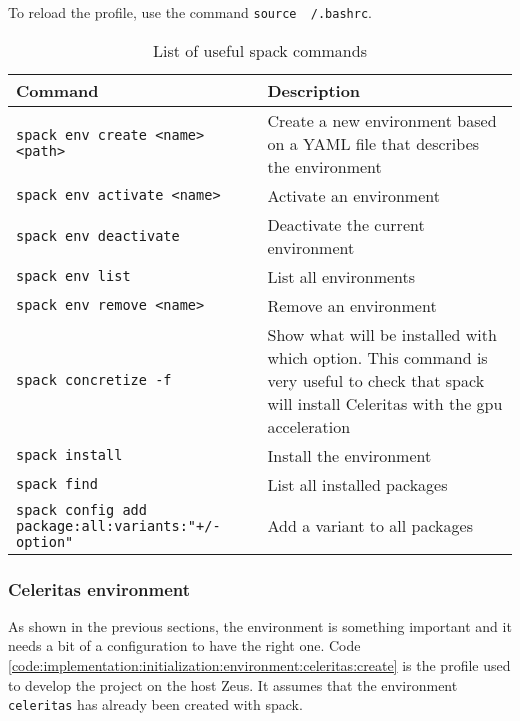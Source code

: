 To reload the profile, use the command \texttt{source ~/.bashrc}.

\begin{table}[ht]
    \centering
    \begin{tabular}{|m{}|m{}|}
        \hline
        \textbf{Command} & \textbf{Description} \\
        \hline
        \texttt{spack env create <name> <path>} & Create a new environment based
            on a YAML file that describes the environment \\
        \hline
        \texttt{spack env activate <name>} & Activate an environment \\
        \hline
        \texttt{spack env deactivate} & Deactivate the current environment \\
        \hline
        \texttt{spack env list} & List all environments \\
        \hline
        \texttt{spack env remove <name>} & Remove an environment \\
        \hline
        \texttt{spack concretize -f} & Show what will be installed with which option.
            This command is very useful to check that spack will install
            Celeritas with the \acrshort{gpu} acceleration \\
        \hline
        \texttt{spack install} & Install the environment \\
        \hline
        \texttt{spack find} & List all installed packages \\
        \hline
        \texttt{spack config add package:all:variants:"+/-option"} & Add a variant to all packages \\
        \hline
    \end{tabular}
    \caption{List of useful spack commands}
    \label{tab:implementation:initialization:environment:spack:commands}
\end{table}


\subsubsection{Celeritas environment}
\label{ch:implementation:initialization:environment:celeritas}

As shown in the previous sections, the environment is something important and
it needs a bit of a configuration to have the right one.
Code \ref{code:implementation:initialization:environment:celeritas:create} is
the profile used to develop the project on the host Zeus.
It assumes that the environment \texttt{celeritas} has already been created with spack.

